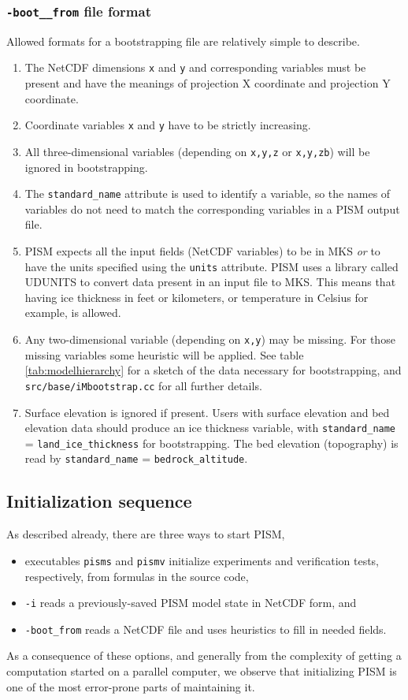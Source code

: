 \documentclass[11pt,final]{amsart}
\newcommand{\und}{\_\!\_}
\begin{document}
\subsubsection*{\texttt{-boot\und from} file format}
\label{sec:bootstrapping-format}  Allowed formats for a bootstrapping file are relatively simple to describe. 
\begin{enumerate}
\item The NetCDF dimensions \verb|x| and \verb|y| and corresponding variables must be present and have the meanings of projection X coordinate and projection Y coordinate.
\item Coordinate variables \verb|x| and \verb|y| have to be strictly increasing.
\item All three-dimensional variables (depending on \verb|x,y,z| or \verb|x,y,zb|) will be ignored in bootstrapping.
\item The \verb|standard_name| attribute is used to identify a variable, so the names of variables do not need to match the corresponding variables in a PISM output file.
\item PISM expects all the input fields (NetCDF variables) to be in MKS \emph{or} to have the units specified using the \verb|units| attribute.  PISM uses a library called UDUNITS to convert data present in an input file to MKS.   This means that having ice thickness in feet or kilometers, or temperature in Celsius for example, is allowed.
\item Any two-dimensional variable (depending on \verb|x,y|) may be missing.  For those missing variables some heuristic will be applied.  See table \ref{tab:modelhierarchy} for a sketch of the data necessary for bootstrapping, and \verb|src/base/iMbootstrap.cc| for all further details.
\item Surface elevation is ignored if present.  Users with surface elevation and bed elevation data should produce an ice thickness variable, with \verb|standard_name| = \verb|land_ice_thickness| for bootstrapping.  The bed elevation (topography) is read by \verb|standard_name| = \verb|bedrock_altitude|.
\end{enumerate}

\subsection{Initialization sequence}  As described already, there are three ways to start PISM,\begin{itemize}
\item executables \verb|pisms| and \verb|pismv| initialize experiments and verification tests, respectively, from formulas in the source code,
\item \verb|-i| reads a previously-saved PISM model state in NetCDF form, and
\item \verb|-boot_from| reads a NetCDF file and uses heuristics to fill in needed fields.
\end{itemize}
As a consequence of these options, and generally from the complexity of getting a computation started on a parallel computer, we observe that initializing PISM is one of the most error-prone parts of maintaining it.
\end{document}
